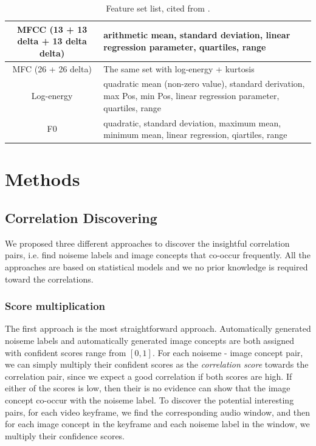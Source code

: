 \documentclass[conference, 11pt, onecolumn]{IEEEtran}
\begin{document}
\begin{table}[h]
\normalsize
\begin{center}
\caption{Feature set list, cited from \cite{wang2014exploring}.}
\label{table:features}
\begin{tabular}{| c | p{10cm} |}
\hline
MFCC (13 + 13 delta + 13 delta delta) & arithmetic mean, standard deviation, linear regression parameter, quartiles, range \\
\hline
MFC (26 + 26 delta) & The same set with log-energy + kurtosis \\
\hline
Log-energy & quadratic mean (non-zero value), standard derivation, max Pos, min Pos, linear regression parameter, quartiles, range \\
\hline
F0 & quadratic, standard deviation, maximum mean, minimum mean, linear regression, qiartiles, range \\
\hline
\end{tabular}
\end{center}
\end{table}

\section{Methods}
\label{section:methods}

\subsection{Correlation Discovering}
We proposed three different approaches to discover the insightful correlation pairs, i.e. find noiseme labels and image concepts that co-occur frequently. All the approaches are based on statistical models and we no prior knowledge is required toward the correlations.

\subsubsection{Score multiplication}
The first approach is the most straightforward approach. Automatically generated noiseme labels and automatically generated image concepts are both assigned with confident scores range from $[0, 1]$. For each noiseme - image concept pair, we can simply multiply their confident scores as the \emph{correlation score} towards the correlation pair, since we expect a good correlation if both scores are high. If either of the scores is low, then their is no evidence can show that the image concept co-occur with the noiseme label. To discover the potential interesting pairs, for each video keyframe, we find the corresponding audio window, and then for each image concept in the keyframe and each noiseme label in the window, we multiply their confidence scores.
\end{document}
